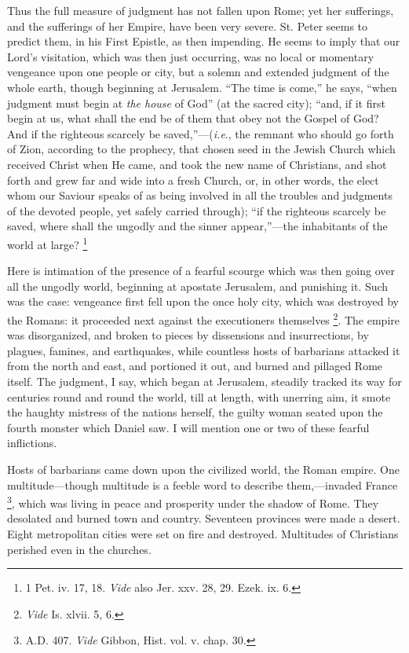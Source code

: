 Thus the full measure of judgment has not fallen upon Rome; yet her
sufferings, and the sufferings of her Empire, have been very severe.
St. Peter seems to predict them, in his First Epistle, as then
impending. He seems to imply that our Lord's visitation, which was
then just occurring, was no local or momentary vengeance upon one
people or city, but a solemn and extended judgment of the whole earth,
though beginning at Jerusalem. ``The time is come,'' he says,
``when judgment must begin at \emph{the house} of God'' (at
the sacred city); ``and, if it first begin at us, what shall the
end be of them that obey not the Gospel of God? And if the righteous
scarcely be saved,''—(\emph{i.e}., the remnant who should go
forth of Zion, according to the prophecy, that chosen seed in the
Jewish Church which received Christ when He came, and took the
new name of Christians, and shot forth and grew far and wide into a
fresh Church, or, in other words, the elect whom our Saviour speaks of
as being involved in all the troubles and judgments of the devoted
people, yet safely carried through); ``if the righteous scarcely
be saved, where shall the ungodly and the sinner appear,''—the
inhabitants of the world at large? \footnote{1 Pet. iv. 17, 18. \emph{Vide} also Jer. xxv. 28, 29. Ezek. ix. 6.}

Here is intimation of the presence of a fearful scourge which was
then going over all the ungodly world, beginning at apostate
Jerusalem, and punishing it. Such was the case: vengeance first fell
upon the once holy city, which was destroyed by the Romans: it
proceeded next against the executioners themselves \footnote{\emph{Vide} Is. xlvii. 5, 6.}. The empire was disorganized, and broken to pieces by
dissensions and insurrections, by plagues, famines, and earthquakes,
while countless hosts of barbarians attacked it from the north and
east, and portioned it out, and burned and pillaged Rome itself. The
judgment, I say, which began at Jerusalem, steadily tracked its way
for centuries round and round the world, till at length, with unerring
aim, it smote the haughty mistress of the nations herself, the guilty
woman seated upon the fourth monster which Daniel saw. I will mention
one or two of these fearful inflictions.

Hosts of barbarians came down upon the civilized world, the Roman
empire. One multitude—though multitude is a feeble word to describe
them,—invaded France \footnote{A.D. 407. \emph{Vide} Gibbon, Hist. vol. v.
chap. 30.},
which was living in peace and prosperity under the shadow of Rome.
They desolated and burned town and country. Seventeen provinces were
made a desert. Eight metropolitan cities were set on fire and
destroyed. Multitudes of Christians perished even in the churches.

